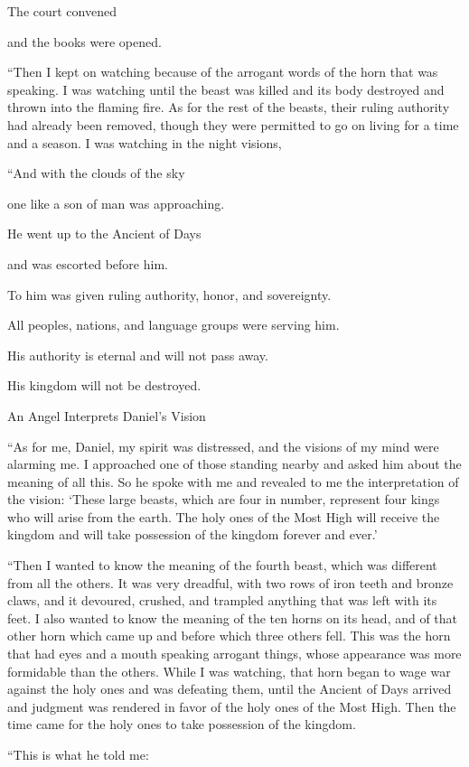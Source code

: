 {\par }{\Q The court
convened
\par }{\Q and the books
were opened.
\par }{\PP {}“Then
I kept on watching
because
of the arrogant words
of the horn
that
was speaking.
I was watching
until
the beast
was killed
and its body
destroyed
and thrown into
the flaming
fire.
As for the rest
of the beasts,
their ruling authority
had already been removed,
though they were permitted
to go on
living
for
a time
and a season.
I was
watching
in the night
visions,
\par }{\Q “And
with
the clouds
of the sky
\par }{\Q one like a son
of man
was
approaching.
\par }{\Q He went up
to
the Ancient
of Days
\par }{\Q and was escorted
before him.
\par }{\Q {}To him was given
ruling authority,
honor,
and sovereignty.
\par }{\Q All
peoples,
nations,
and language groups
were serving
him.
\par }{\Q His authority
is eternal
and will not
pass away.
\par }{\Q His kingdom
will not
be destroyed.
\par }{\SH An Angel Interprets Daniel’s Vision
\par }{\PP {}“As for me,
Daniel,
my spirit
was distressed,
and the visions
of my mind
were alarming me.
I approached
one
of
those standing
nearby and asked
him
about the meaning
of
all
this.
So he spoke
with me and revealed
to me the interpretation
of the vision:
‘These
large
beasts,
which
are
four
in number, represent four
kings
who will arise
from
the earth.
The holy ones
of the Most High
will receive
the kingdom
and will take possession
of the kingdom
forever
and ever.’
\par }{\PP {}“Then
I wanted
to know the meaning
of
the fourth
beast,
which
was
different
from
all
the others. It was very
dreadful,
with two rows of iron
teeth
and bronze
claws,
and it devoured,
crushed,
and trampled
anything that was left
with its feet.
I also wanted to know the meaning of
the ten
horns
on its head,
and of that other
horn which
came up
and before
which three
others fell.
This
was the horn
that had eyes
and a mouth
speaking
arrogant things,
whose appearance
was more formidable
than
the others.
While I was
watching,
that
horn
began to wage
war
against
the holy ones
and was defeating them,
until
the Ancient
of Days
arrived
and judgment
was rendered
in favor of the holy ones
of the Most High.
Then the time
came for
the holy ones
to take possession
of the kingdom.
\par }{\Q {}“This is what
he told
me:

}

